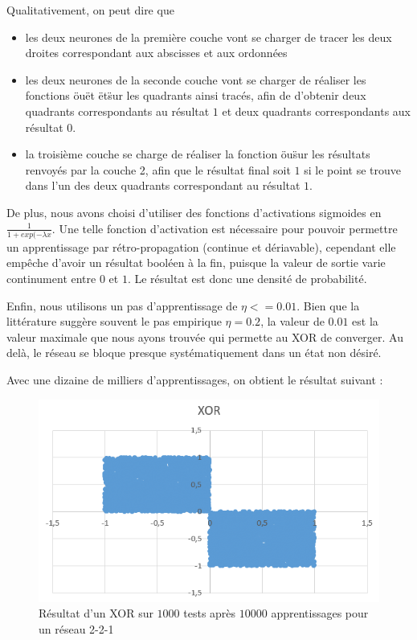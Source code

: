 Qualitativement, on peut dire que 
\begin{itemize}
  \item les deux neurones de la première couche vont se charger de tracer les deux droites correspondant aux abscisses et aux ordonnées
  \item les deux neurones de la seconde couche vont se charger de réaliser les fonctions \"ou\" et \"et\" sur les quadrants ainsi tracés, afin de d'obtenir deux quadrants correspondants au résultat $1$ et deux quadrants correspondants aux résultat $0$.
  \item la troisième couche se charge de réaliser la fonction \"ou\" sur les résultats renvoyés par la couche 2, afin que le résultat final soit $1$ si le point se trouve dans l'un des deux quadrants correspondant au résultat $1$.
\end{itemize}

De plus, nous avons choisi d'utiliser des fonctions d'activations sigmoides en $\frac{1}{1+exp(-\lambda x}$. Une telle fonction d'activation est nécessaire pour pouvoir permettre un apprentissage par rétro-propagation (continue et dériavable), cependant elle empêche d'avoir un résultat booléen à la fin, puisque la valeur de sortie varie continument entre $0$ et $1$. Le résultat est donc une densité de probabilité. 

Enfin, nous utilisons un pas d'apprentissage de $\eta <= 0.01$. Bien que la littérature suggère souvent le pas empirique $\eta = 0.2$, la valeur de $0.01$ est la valeur maximale que nous ayons trouvée qui permette au XOR de converger. Au delà, le réseau se bloque presque systématiquement dans un état non désiré.

Avec une dizaine de milliers d'apprentissages, on obtient le résultat suivant : 

\begin{figure}[h!]
  \centering
  \includegraphics[scale=0.5]{images/resultat_xor.png}
  \caption{Résultat d'un XOR sur $1000$ tests après $10000$ apprentissages pour un réseau 2-2-1}
\end{figure}
